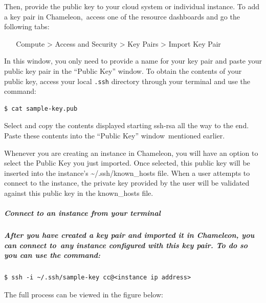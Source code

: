 Then, provide the public key to your cloud system or individual
instance. To add a key pair in Chameleon,~access one of the resource
dashboards and go the following tabs:

~ ~ Compute \textgreater{} Access and Security \textgreater{} Key Pairs
\textgreater{} Import Key Pair

In this window, you only need to provide a name for your key pair and
paste your public key pair in the ``Public Key'' window. To obtain the
contents of your public key, access your local \texttt{.ssh} directory
through your terminal and use the command:

\begin{verbatim}
$ cat sample-key.pub
\end{verbatim}

Select and copy the contents displayed starting ssh-rsa all the way to
the end. Paste these contents into the ``Public Key'' window~mentioned
earlier.

Whenever you are creating an instance in Chameleon, you will have an
option to select the Public Key you just imported. Once selected, this
public key will be inserted into the instance's
\textasciitilde{}/.ssh/known\_hosts file. When a user attempts to
connect to the instance, the private key provided by the user will be
validated against this public key in the known\_hosts file.

\subparagraph{Connect to an instance from your
terminal}\label{connect-to-an-instance-from-your-terminal}

\subparagraph{After you have created a key pair and imported it in
Chameleon, you can connect to~any instance configured with this key
pair. To do so you can use the
command:}\label{after-you-have-created-a-key-pair-and-imported-it-in-chameleon-you-can-connect-toany-instance-configured-with-this-key-pair.-to-do-so-you-can-use-the-command}

\begin{verbatim}
$ ssh -i ~/.ssh/sample-key cc@<instance ip address>
\end{verbatim}

The full process can be viewed in the figure below:

